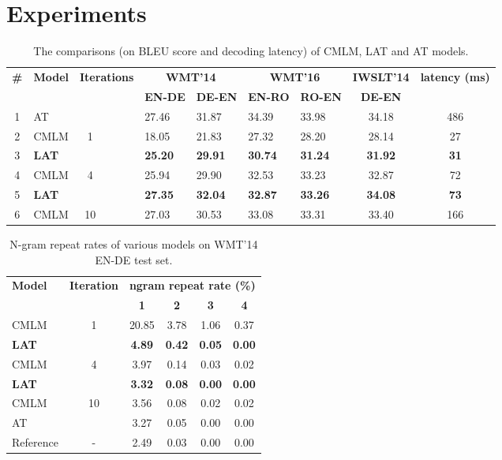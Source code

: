 \documentclass[11pt,a4paper]{article}
\begin{document}
\section{Experiments}
\begin{table*}[th!]
\centering
\small
\begin{tabular}{clcllllcc}
\toprule
\multirow{2}{*}{\textbf{\#}} & \multirow{2}{*}{\textbf{Model}} & \multirow{2}{*}{\textbf{Iterations}} & \multicolumn{2}{c}{\textbf{WMT'14}} & \multicolumn{2}{c}{\textbf{WMT'16}} & \textbf{IWSLT'14} & \multirow{2}{*}{\textbf{latency (ms)}}\\
 & & &\textbf{EN-DE} & \textbf{DE-EN} & \textbf{EN-RO} & \textbf{RO-EN} & \textbf{DE-EN}\\
 \midrule
1 & AT &  ~~~~~~ & 27.46 & 31.87 & 34.39 & 33.98 & 34.18 & 486\\
\midrule
2 &CMLM
& \multirow{2}{*}{1~~~~~~} &  18.05 & 21.83 & 27.32 & 28.20 & 28.14 & 27\\
3 &\textbf{LAT} &   & \textbf{25.20} &\textbf{29.91}&\textbf{30.74}&\textbf{31.24}&\textbf{31.92} & \textbf{31}\\
\midrule
4 &CMLM
& \multirow{2}{*}{4~~~~~~} & 25.94 & 29.90 & 32.53 & 33.23 & 32.87 & 72\\
5 &\textbf{LAT} &  & \textbf{27.35} & \textbf{32.04} & \textbf{32.87} & \textbf{33.26} & \textbf{34.08} & \textbf{73}\\
\midrule
6 &CMLM
 & 10~~~~~~ & 27.03 & 30.53 & 33.08 & 33.31 & 33.40 & 166\\
\bottomrule
\end{tabular}
\caption{The comparisons (on BLEU score and decoding latency) of CMLM, LAT and AT models.
}
\label{tab:main-rst}
\end{table*}

\begin{table}[!ht]
    \centering
    \small
    \begin{tabular}{lccccc}
        \toprule
        \textbf{Model} & \textbf{Iteration} & \multicolumn{4}{c}{\textbf{ngram repeat rate (\%)}} \\
        & & \textbf{1} & \textbf{2} & \textbf{3} & \textbf{4}\\
        \midrule
        CMLM &  \multirow{2}{*}{1} & 20.85 & 3.78 & 1.06 & 0.37\\
        \textbf{LAT} & & \textbf{4.89} & \textbf{0.42} & \textbf{0.05} &  \textbf{0.00}\\
        \midrule
        CMLM &  \multirow{2}{*}{4} & 3.97 & 0.14 & 0.03 & 0.02\\
       \textbf{LAT} & & \textbf{3.32} & \textbf{0.08} & \textbf{0.00} & \textbf{0.00}\\ 
       \midrule
       CMLM & 10 & 3.56 & 0.08 & 0.02 & 0.02\\
        \midrule
        \midrule
        AT &  & 3.27 & 0.05 & 0.00 & 0.00 \\
        Reference & - & 2.49 & 0.03 & 0.00 & 0.00\\
        \bottomrule
    \end{tabular}
    \caption{N-gram repeat rates of various models on WMT'14 EN-DE test set.
}
    \label{tab:rr}
\end{table}
\end{document}
